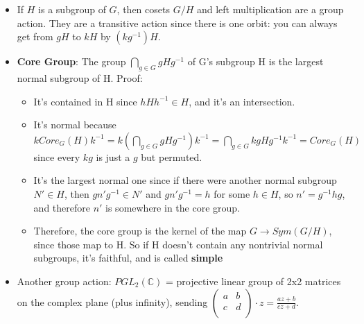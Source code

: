 \documentclass[11pt, oneside]{article}   	%
\begin{document}
\begin{itemize}
\begin {itemize}
  \item If $H$ is a subgroup of $G$, then cosets $G / H$ and left multiplication are a group action.  They are a transitive action since there is one orbit: you can always get from $gH$ to $kH$ by $(kg^{-1})H$.
  \item \textbf{Core Group}: The group $\bigcap_{g \in G} gHg^{-1}$ of G's subgroup H is the largest normal subgroup of H.  Proof:
  \begin{itemize}
  \item It's contained in H since $hHh^{-1} \in H$, and it's an intersection.
  \item It's normal because $kCore_G(H)k^{-1} = k (\bigcap_{g \in G} gHg^{-1}) k^{-1}  = \bigcap_{g \in G} kgHg^{-1}k^{-1} = Core_G(H)$ since every $kg$ is just a $g$ but permuted. 
  \item It's the largest normal one since if there were another normal subgroup $N' \in H$, then $gn'g^{-1} \in N'$ and $gn'g^{-1} = h$ for some $h \in H$, so $n' = g^{-1}hg$, and therefore $n'$ is somewhere in the core group.
  \item Therefore, the core group is the kernel of the map $G \rightarrow Sym(G/H)$, since those map to H.  So if H doesn't contain any nontrivial normal subgroups, it's faithful, and is called \textbf{simple}  
  \end{itemize}	  
  \item Another group action: $PGL_2(\mathbb{C})$ = projective linear group of 2x2 matrices on the complex plane (plus infinity), sending $\begin{pmatrix} a & b \\ c & d\\ \end{pmatrix} \cdot z = \frac{az+b}{cz+d}$.  
  
  \end{itemize}
  


\end{itemize}
\end{document}

